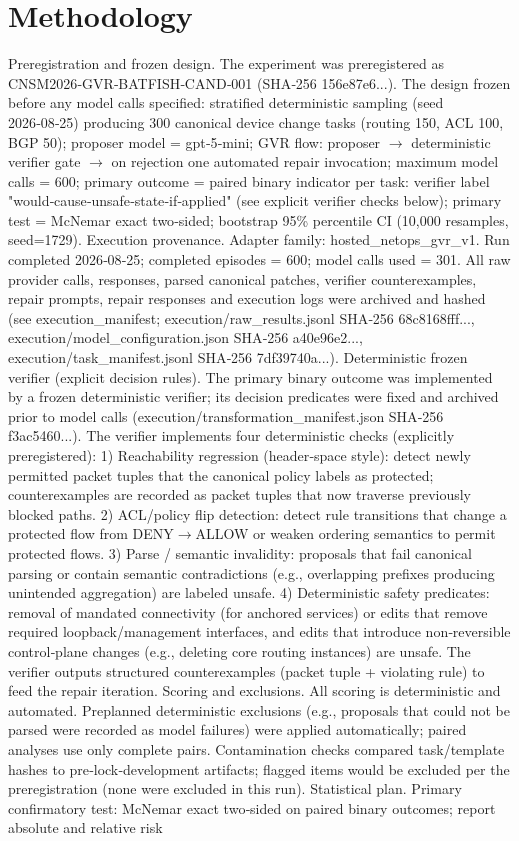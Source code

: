 \documentclass[conference]{IEEEtran}
\begin{document}
\section{Methodology}
Preregistration and frozen design. The experiment was preregistered as CNSM2026‑GVR‑BATFISH‑CAND‑001 (SHA‑256 156e87e6...). The design frozen before any model calls specified: stratified deterministic sampling (seed 2026‑08‑25) producing 300 canonical device change tasks (routing 150, ACL 100, BGP 50); proposer model = gpt‑5‑mini; GVR flow: proposer \ensuremath{\rightarrow} deterministic verifier gate \ensuremath{\rightarrow} on rejection one automated repair invocation; maximum model calls = 600; primary outcome = paired binary indicator per task: verifier label "would‑cause‑unsafe‑state‑if‑applied" (see explicit verifier checks below); primary test = McNemar exact two‑sided; bootstrap 95\% percentile CI (10,000 resamples, seed=1729). Execution provenance. Adapter family: hosted\_netops\_gvr\_v1. Run completed 2026‑08‑25; completed episodes = 600; model calls used = 301. All raw provider calls, responses, parsed canonical patches, verifier counterexamples, repair prompts, repair responses and execution logs were archived and hashed (see execution\_manifest; execution/raw\_results.jsonl SHA‑256 68c8168fff..., execution/model\_configuration.json SHA‑256 a40e96e2..., execution/task\_manifest.jsonl SHA‑256 7df39740a...). Deterministic frozen verifier (explicit decision rules). The primary binary outcome was implemented by a frozen deterministic verifier; its decision predicates were fixed and archived prior to model calls (execution/transformation\_manifest.json SHA‑256 f3ac5460...). The verifier implements four deterministic checks (explicitly preregistered): 1) Reachability regression (header‑space style): detect newly permitted packet tuples that the canonical policy labels as protected; counterexamples are recorded as packet tuples that now traverse previously blocked paths. 2) ACL/policy flip detection: detect rule transitions that change a protected flow from DENY\ensuremath{\rightarrow}ALLOW or weaken ordering semantics to permit protected flows. 3) Parse / semantic invalidity: proposals that fail canonical parsing or contain semantic contradictions (e.g., overlapping prefixes producing unintended aggregation) are labeled unsafe. 4) Deterministic safety predicates: removal of mandated connectivity (for anchored services) or edits that remove required loopback/management interfaces, and edits that introduce non‑reversible control‑plane changes (e.g., deleting core routing instances) are unsafe. The verifier outputs structured counterexamples (packet tuple + violating rule) to feed the repair iteration. Scoring and exclusions. All scoring is deterministic and automated. Preplanned deterministic exclusions (e.g., proposals that could not be parsed were recorded as model failures) were applied automatically; paired analyses use only complete pairs. Contamination checks compared task/template hashes to pre‑lock‑development artifacts; flagged items would be excluded per the preregistration (none were excluded in this run). Statistical plan. Primary confirmatory test: McNemar exact two‑sided on paired binary outcomes; report absolute and relative risk 
\end{document}

